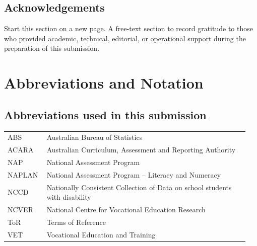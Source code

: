 \clearpage
\section{Acknowledgements}

\begin{instructional}
Start this section on a new page. A free-text section to record gratitude to those who provided academic, technical, editorial, or operational support during the preparation of this submission.
\end{instructional}


\clearpage
\tableofcontents
\clearpage
\listoffigures
\clearpage
\listoftables


\chapter[Abbreviations and Notation]{Abbreviations and Notation}

\section{Abbreviations used in this submission}
\noindent
\begin{longtable}{p{0.15\linewidth} p{0.80\linewidth}}
    ABS    & Australian Bureau of Statistics                                  \\
    ACARA  & Australian Curriculum, Assessment and Reporting Authority        \\
    NAP    & National Assessment Program                                      \\
    NAPLAN & National Assessment Program -- Literacy and Numeracy             \\
    NCCD   & Nationally Consistent Collection of Data on school students with disability \\
    NCVER  & National Centre for Vocational Education Research                \\
    ToR    & Terms of Reference                                               \\
    VET    & Vocational Education and Training                                \\
\end{longtable}

